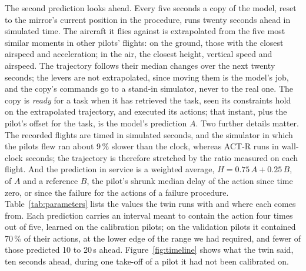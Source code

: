 \documentclass{llncs}
\begin{document}
The second prediction looks ahead. Every five seconds a copy of the model, reset to the mirror's current position in the procedure, runs
twenty seconds ahead in simulated time. The aircraft it flies against is extrapolated from the five most similar moments in other
pilots' flights: on the ground, those with the closest airspeed and acceleration; in the air, the closest height, vertical speed and
airspeed. The trajectory follows their median changes over the next twenty seconds; the levers are not extrapolated, since moving them
is the model's job, and the copy's commands go to a stand-in simulator, never to the real one. The copy is \emph{ready} for a task when it
has retrieved the task, seen its constraints hold on the extrapolated trajectory, and executed its actions; that instant, plus the
pilot's offset for the task, is the model's prediction $A$. Two further details matter. The recorded flights are timed in simulated
seconds, and the simulator in which the pilots flew ran about 9\,\% slower than the clock, whereas ACT-R runs in wall-clock seconds; the
trajectory is therefore stretched by the ratio measured on each flight. And the prediction in service is a weighted average,
$H = 0.75\,A + 0.25\,B$, of $A$ and a reference $B$, the pilot's shrunk median delay of the action since time zero, or since the failure
for the actions of a failure procedure. Table~\ref{tab:parameters} lists the values the twin runs with and where each comes from. Each
prediction carries an interval meant to contain the action four times out of five, learned on the calibration pilots; on the validation
pilots it contained 70\,\% of their actions, at the lower edge of the range we had required, and fewer of those predicted 10 to 20\,s
ahead. Figure~\ref{fig:timeline} shows what the twin said, ten seconds ahead, during one take-off of a pilot it had not been calibrated on.
\end{document}
